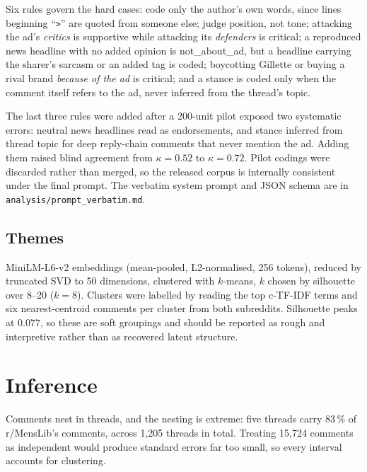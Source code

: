 \documentclass[11pt,a4paper]{article}
\newcommand{\code}[1]{\texttt{\small #1}}
\begin{document}
Six rules govern the hard cases: code only the author's own words, since lines beginning
``\code{>}'' are quoted from someone else; judge position, not tone; attacking the ad's
\emph{critics} is supportive while attacking its \emph{defenders} is critical; a reproduced news
headline with no added opinion is not\_about\_ad, but a headline carrying the sharer's sarcasm or an
added tag is coded; boycotting Gillette or buying a rival brand \emph{because of the ad} is
critical; and a stance is coded only when the comment itself refers to the ad, never inferred from
the thread's topic.

The last three rules were added after a 200-unit pilot exposed two systematic errors: neutral news
headlines read as endorsements, and stance inferred from thread topic for deep reply-chain comments
that never mention the ad. Adding them raised blind agreement from $\kappa = 0.52$ to
$\kappa = 0.72$. Pilot codings were discarded rather than merged, so the released corpus is
internally consistent under the final prompt. The verbatim system prompt and JSON schema are in
\code{analysis/prompt\_verbatim.md}.

\subsection{Themes}

MiniLM-L6-v2 embeddings (mean-pooled, L2-normalised, 256 tokens), reduced by truncated SVD to 50
dimensions, clustered with $k$-means, $k$ chosen by silhouette over 8--20 ($k=8$). Clusters were
labelled by reading the top c-TF-IDF terms and six nearest-centroid comments per cluster from both
subreddits. Silhouette peaks at 0.077, so these are soft groupings and should be reported as rough
and interpretive rather than as recovered latent structure.

\section{Inference}

Comments nest in threads, and the nesting is extreme: five threads carry 83\,\% of r/MensLib's
comments, across 1{,}205 threads in total. Treating 15{,}724 comments as independent would produce
standard errors far too small, so every interval accounts for clustering.
\end{document}
